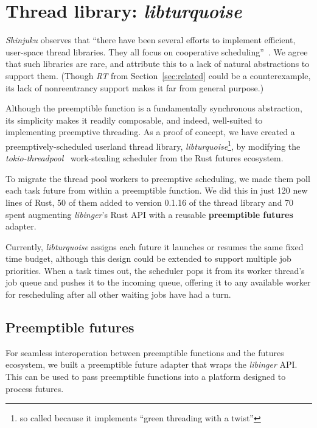 \section{Thread library: \textit{libturquoise}}
\label{sec:libturquoise}

\textit{Shinjuku} observes that ``there have been several efforts to implement
efficient, user-space thread libraries.  They all focus on cooperative
scheduling''~\cite{Kaffes:nsdi2019}.  We agree that such libraries are rare, and
attribute this to a lack of natural abstractions to support them.  (Though
\textit{RT} from Section~\ref{sec:related} could be a counterexample, its lack of
nonreentrancy support makes it far from general purpose.)

Although the preemptible function is a fundamentally synchronous abstraction, its
simplicity makes it readily composable, and indeed, well-suited to implementing
preemptive threading.  As a proof of concept, we have created a
preemptively-scheduled userland thread library, \textit{libturquoise}\footnote{so
called because it implements ``green threading with a twist''}, by modifying the
\textit{tokio-threadpool}~\cite{www-tokio-threadpool} work-stealing scheduler from
the Rust futures ecosystem.

To migrate the thread pool workers to preemptive scheduling, we made them poll each
task future from within a preemptible function.  We did this in
just 120 new lines of Rust, 50 of them added to version 0.1.16 of the thread library
and
70 spent augmenting \textit{libinger}'s Rust API with a reusable \textbf{preemptible
futures} adapter.

Currently, \textit{libturquoise} assigns each future it launches or resumes the same
fixed time budget, although this design could be extended to support
multiple job priorities.  When a task times out, the scheduler pops it from its
worker thread's job queue and pushes it to the incoming queue,
offering it to any available worker for rescheduling after all other waiting jobs
have had a turn.


\subsection{Preemptible futures}

For seamless interoperation between preemptible functions and the futures ecosystem,
we built a preemptible future adapter that wraps the \textit{libinger} API.  This
can be used to pass preemptible functions into a platform designed to process
futures.

